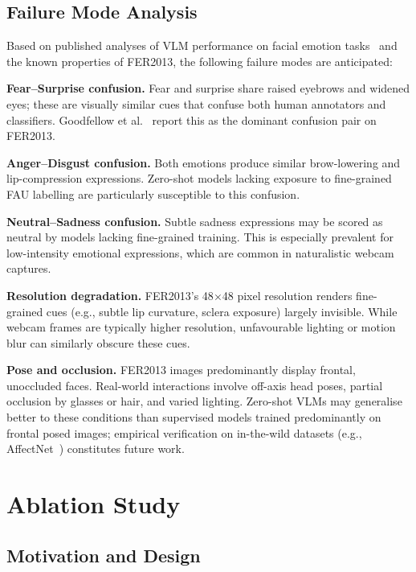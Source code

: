 \documentclass[conference]{IEEEtran}
\begin{document}
\subsection{Failure Mode Analysis}

Based on published analyses of VLM performance on facial
emotion tasks~\cite{li2022fer_survey} and the known properties
of FER2013, the following failure modes are anticipated:

\textbf{Fear--Surprise confusion.}
Fear and surprise share raised eyebrows and widened eyes;
these are visually similar cues that confuse both human
annotators and classifiers.
Goodfellow et al.~\cite{goodfellow2013fer} report this as
the dominant confusion pair on FER2013.

\textbf{Anger--Disgust confusion.}
Both emotions produce similar brow-lowering and
lip-compression expressions.
Zero-shot models lacking exposure to fine-grained FAU
labelling are particularly susceptible to this confusion.

\textbf{Neutral--Sadness confusion.}
Subtle sadness expressions may be scored as neutral by
models lacking fine-grained training.
This is especially prevalent for low-intensity emotional
expressions, which are common in naturalistic webcam
captures.

\textbf{Resolution degradation.}
FER2013's 48$\times$48 pixel resolution renders fine-grained
cues (e.g., subtle lip curvature, sclera exposure) largely
invisible.
While webcam frames are typically higher resolution,
unfavourable lighting or motion blur can similarly obscure
these cues.

\textbf{Pose and occlusion.}
FER2013 images predominantly display frontal, unoccluded
faces.
Real-world interactions involve off-axis head poses, partial
occlusion by glasses or hair, and varied lighting.
Zero-shot VLMs may generalise better to these conditions
than supervised models trained predominantly on frontal
posed images; empirical verification on in-the-wild datasets
(e.g., AffectNet~\cite{mollahosseini2019affectnet}) constitutes
future work.

\section{Ablation Study}
\label{sec:ablation}

\subsection{Motivation and Design}
\end{document}
